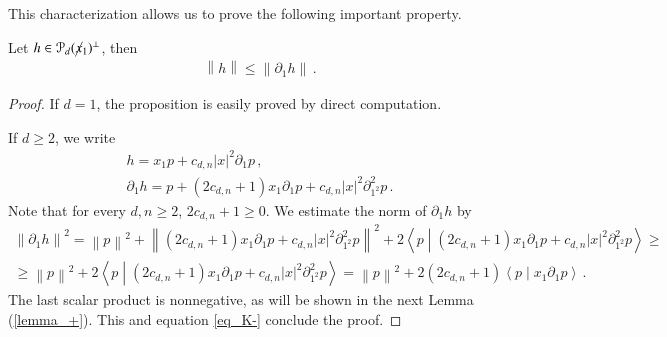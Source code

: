 \documentclass[11pt]{article}
\begin{document}
This characterization allows us to prove the following important property.
\begin{proposition}\label{prop_perpest}
 Let $h\in {\mathcal{P}}_d(\cancel x_1)^\perp$, then
 \begin{gather}
  {\left\|{h}\right\|}\leq {\left\|{\partial_1 h}\right\|}\, .
 \end{gather}
\end{proposition}

\begin{proof}
If $d=1$, the proposition is easily proved by direct computation.

If $d\geq 2$, we write
\begin{gather}
 h = x_1 p + c_{d,n}{\left|x\right|} ^2 \partial _1 p\, ,\\
 \partial_1 h = p + (2c_{d,n}+1) x_1 \partial_1 p + c_{d,n} {\left|x\right|} ^2 \partial^2_{1^2} p\, .
\end{gather}
Note that for every $d,n\geq 2$, $2c_{d,n}+1\geq 0$. We estimate the norm of $\partial_1 h$ by
\begin{gather}
 {\left\|{\partial_1 h}\right\|}^2 = {\left\|p\right\|} ^2 + {\left\|{(2c_{d,n}+1) x_1 \partial_1 p + c_{d,n} {\left|x\right|} ^2 \partial^2_{1^2} p}\right\|}^2 + 2 {\left\langle{p}\middle\vert{(2c_{d,n}+1) x_1 \partial_1 p + c_{d,n} {\left|x\right|} ^2 \partial^2_{1^2} p}\right\rangle}\geq\\
 \geq {\left\|p\right\|} ^2 +  2 {\left\langle{p}\middle\vert{(2c_{d,n}+1)x_1 \partial_1 p + c_{d,n}{\left|x\right|} ^2 \partial^2_{1^2} p}\right\rangle}={\left\|p\right\|} ^2 +  2 (2c_{d,n}+1) {\left\langle{p}\middle\vert{x_1 \partial_1 p}\right\rangle}\, .
\end{gather}
The last scalar product is nonnegative, as will be shown in the next Lemma (\ref{lemma_+}). This and equation \eqref{eq_K-} conclude the proof.
\end{proof}
\end{document}
